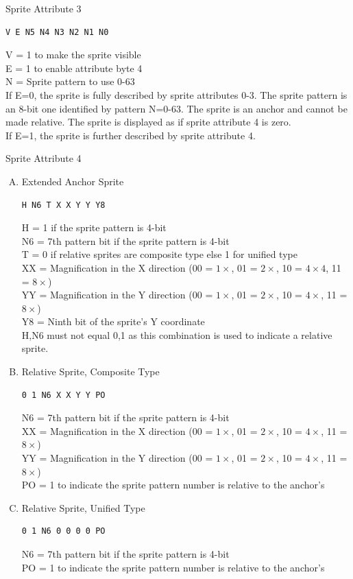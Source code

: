 Sprite Attribute 3
\begin{verbatim}
V E N5 N4 N3 N2 N1 N0
\end{verbatim}
V = 1 to make the sprite visible\\
E = 1 to enable attribute byte 4\\
N = Sprite pattern to use 0-63\\
If E=0, the sprite is fully described by sprite attributes 0-3. The
sprite pattern is an 8-bit one identified by pattern N=0-63. The
sprite is an anchor and cannot be made relative. The sprite is
displayed as if sprite attribute 4 is zero.\\
If E=1, the sprite is further described by sprite attribute 4.

Sprite Attribute 4
\begin{enumerate}[A.]
\item Extended Anchor Sprite
\begin{verbatim}
H N6 T X X Y Y Y8
\end{verbatim}
H = 1 if the sprite pattern is 4-bit\\
N6 = 7th pattern bit if the sprite pattern is 4-bit\\
T = 0 if relative sprites are composite type else 1 for unified type\\
XX = Magnification in the X direction (00 = $1\times$, 01 = $2\times$,
10 = $4\times4$, 11 = $8\times$)\\
YY = Magnification in the Y direction (00 = $1\times$, 01 = $2\times$,
10 = $4\times$, 11 = $8\times$)\\
Y8 = Ninth bit of the sprite’s Y coordinate\\
{H,N6} must not equal {0,1} as this combination is used to indicate a
relative sprite.

\item Relative Sprite, Composite Type
\begin{verbatim}
0 1 N6 X X Y Y PO
\end{verbatim}
N6 = 7th pattern bit if the sprite pattern is 4-bit\\
XX = Magnification in the X direction (00 = $1\times$, 01 = $2\times$,
10 = $4\times$, 11 = $8\times$)\\
YY = Magnification in the Y direction (00 = $1\times$, 01 = $2\times$,
10 = $4\times$, 11 = $8\times$)\\
PO = 1 to indicate the sprite pattern number is relative to the
anchor’s

\item Relative Sprite, Unified Type
\begin{verbatim}
0 1 N6 0 0 0 0 PO
\end{verbatim}
N6 = 7th pattern bit if the sprite pattern is 4-bit\\
PO = 1 to indicate the sprite pattern number is relative to the
anchor’s
\end{enumerate}
